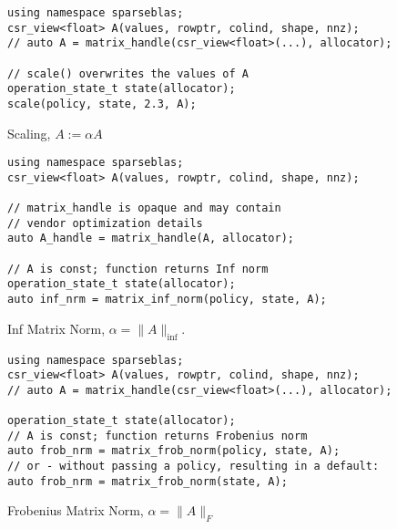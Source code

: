 \documentclass{article}
\begin{document}

\begin{listing}[H]
\begin{verbatim}
using namespace sparseblas;
csr_view<float> A(values, rowptr, colind, shape, nnz);
// auto A = matrix_handle(csr_view<float>(...), allocator);

// scale() overwrites the values of A 
operation_state_t state(allocator);
scale(policy, state, 2.3, A);
\end{verbatim}
\caption{Scaling, $A := \alpha A$}
\end{listing}



\begin{listing}[H]
\begin{verbatim}
using namespace sparseblas;
csr_view<float> A(values, rowptr, colind, shape, nnz);

// matrix_handle is opaque and may contain 
// vendor optimization details
auto A_handle = matrix_handle(A, allocator);

// A is const; function returns Inf norm
operation_state_t state(allocator);
auto inf_nrm = matrix_inf_norm(policy, state, A);
\end{verbatim}
\caption{Inf Matrix Norm, $\alpha = \|A\|_\text{inf}$.}
\end{listing}



\begin{listing}[H]
\begin{verbatim}
using namespace sparseblas;
csr_view<float> A(values, rowptr, colind, shape, nnz);
// auto A = matrix_handle(csr_view<float>(...), allocator);

operation_state_t state(allocator);
// A is const; function returns Frobenius norm
auto frob_nrm = matrix_frob_norm(policy, state, A);
// or - without passing a policy, resulting in a default:
auto frob_nrm = matrix_frob_norm(state, A);
\end{verbatim}
\caption{Frobenius Matrix Norm, $\alpha = \|A\|_F$}
\end{listing}
\end{document}
